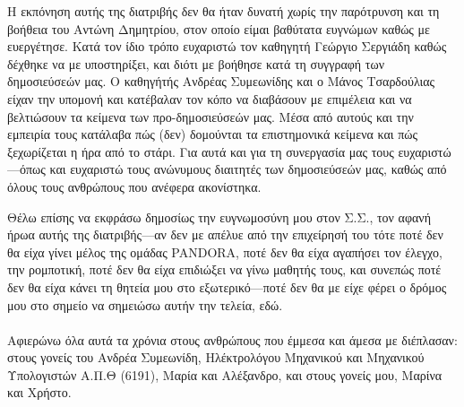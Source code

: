 \cleardoublepage

Η εκπόνηση αυτής της διατριβής δεν θα ήταν δυνατή χωρίς την παρότρυνση και τη
βοήθεια του Αντώνη Δημητρίου, στον οποίο είμαι βαθύτατα ευγνώμων καθώς με
ευεργέτησε. Κατά τον ίδιο τρόπο ευχαριστώ τον καθηγητή Γεώργιο Σεργιάδη καθώς
δέχθηκε να με υποστηρίξει, και διότι με βοήθησε κατά τη συγγραφή των
δημοσιεύσεών μας. Ο καθηγήτής Ανδρέας Συμεωνίδης και ο Μάνος Τσαρδούλιας είχαν
την υπομονή και κατέβαλαν τον κόπο να διαβάσουν με επιμέλεια και να βελτιώσουν
τα κείμενα των προ-δημοσιεύσεών μας. Μέσα από αυτούς και την εμπειρία τους
κατάλαβα πώς (δεν) δομούνται τα επιστημονικά κείμενα και πώς ξεχωρίζεται η ήρα
από το στάρι. Για αυτά και για τη συνεργασία μας τους ευχαριστώ---όπως και
ευχαριστώ τους ανώνυμους διαιτητές των δημοσιεύσεών μας, καθώς από όλους τους
ανθρώπους που ανέφερα ακονίστηκα.

Θέλω επίσης να εκφράσω δημοσίως την ευγνωμοσύνη μου στον Σ.Σ., τον αφανή ήρωα
αυτής της διατριβής---αν δεν με απέλυε από την επιχείρησή του τότε ποτέ δεν θα
είχα γίνει μέλος της ομάδας PANDORA, ποτέ δεν θα είχα αγαπήσει τον έλεγχο, την
ρομποτική, ποτέ δεν θα είχα επιδιώξει να γίνω μαθητής τους, και συνεπώς ποτέ
δεν θα είχα κάνει τη θητεία μου στο εξωτερικό---ποτέ δεν θα με είχε φέρει ο
δρόμος μου στο σημείο να σημειώσω αυτήν την τελεία, εδώ. \\ \\

Αφιερώνω όλα αυτά τα χρόνια στους ανθρώπους που έμμεσα και άμεσα με διέπλασαν:
στους γονείς του Ανδρέα Συμεωνίδη, Ηλέκτρολόγου Μηχανικού και Μηχανικού
Υπολογιστών Α.Π.Θ (6191), Μαρία και Αλέξανδρο, και στους γονείς μου, Μαρίνα και
Χρήστο.

\restoregeometry
\cleardoublepage
